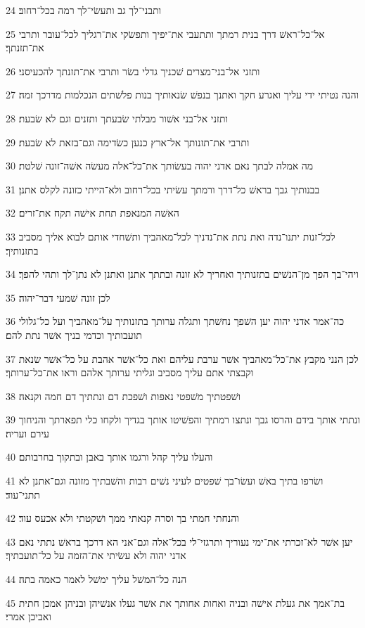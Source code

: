 \par 24 ותבני־לך גב ותעשׂי־לך רמה בכל־רחוב׃
\par 25 אל־כל־ראשׁ דרך בנית רמתך ותתעבי את־יפיך ותפשׂקי את־רגליך לכל־עובר ותרבי את־תזנתך׃
\par 26 ותזני אל־בני־מצרים שׁכניך גדלי בשׂר ותרבי את־תזנתך להכעיסני׃
\par 27 והנה נטיתי ידי עליך ואגרע חקך ואתנך בנפשׁ שׂנאותיך בנות פלשׁתים הנכלמות מדרכך זמה׃
\par 28 ותזני אל־בני אשׁור מבלתי שׂבעתך ותזנים וגם לא שׂבעת׃
\par 29 ותרבי את־תזנותך אל־ארץ כנען כשׂדימה וגם־בזאת לא שׂבעת׃
\par 30 מה אמלה לבתך נאם אדני יהוה בעשׂותך את־כל־אלה מעשׂה אשׁה־זונה שׁלטת׃
\par 31 בבנותיך גבך בראשׁ כל־דרך ורמתך עשׂיתי בכל־רחוב ולא־הייתי כזונה לקלס אתנן׃
\par 32 האשׁה המנאפת תחת אישׁה תקח את־זרים׃
\par 33 לכל־זנות יתנו־נדה ואת נתת את־נדניך לכל־מאהביך ותשׁחדי אותם לבוא אליך מסביב בתזנותיך׃
\par 34 ויהי־בך הפך מן־הנשׁים בתזנותיך ואחריך לא זונה ובתתך אתנן ואתנן לא נתן־לך ותהי להפך׃
\par 35 לכן זונה שׁמעי דבר־יהוה׃
\par 36 כה־אמר אדני יהוה יען השׁפך נחשׁתך ותגלה ערותך בתזנותיך על־מאהביך ועל כל־גלולי תועבותיך וכדמי בניך אשׁר נתת להם׃
\par 37 לכן הנני מקבץ את־כל־מאהביך אשׁר ערבת עליהם ואת כל־אשׁר אהבת על כל־אשׁר שׂנאת וקבצתי אתם עליך מסביב וגליתי ערותך אלהם וראו את־כל־ערותך׃
\par 38 ושׁפטתיך משׁפטי נאפות ושׁפכת דם ונתתיך דם חמה וקנאה׃
\par 39 ונתתי אותך בידם והרסו גבך ונתצו רמתיך והפשׁיטו אותך בגדיך ולקחו כלי תפארתך והניחוך עירם ועריה׃
\par 40 והעלו עליך קהל ורגמו אותך באבן ובתקוך בחרבותם׃
\par 41 ושׂרפו בתיך באשׁ ועשׂו־בך שׁפטים לעיני נשׁים רבות והשׁבתיך מזונה וגם־אתנן לא תתני־עוד׃
\par 42 והנחתי חמתי בך וסרה קנאתי ממך ושׁקטתי ולא אכעס עוד׃
\par 43 יען אשׁר לא־זכרתי את־ימי נעוריך ותרגזי־לי בכל־אלה וגם־אני הא דרכך בראשׁ נתתי נאם אדני יהוה ולא עשׂיתי את־הזמה על כל־תועבתיך׃
\par 44 הנה כל־המשׁל עליך ימשׁל לאמר כאמה בתה׃
\par 45 בת־אמך את געלת אישׁה ובניה ואחות אחותך את אשׁר געלו אנשׁיהן ובניהן אמכן חתית ואביכן אמרי׃
